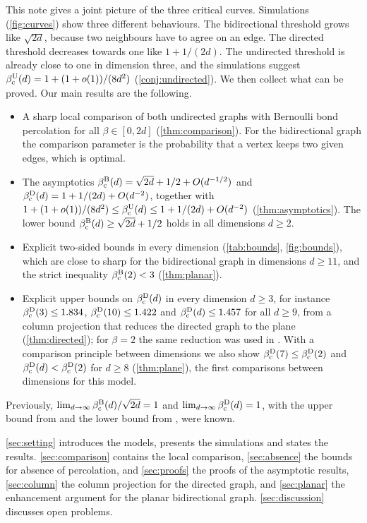\documentclass[11pt,letterpaper]{article}
\begin{document}
This note gives a joint picture of the three critical curves. Simulations (\cref{fig:curves}) show three different behaviours. The bidirectional threshold grows like $\sqrt{2d}$, because two neighbours have to agree on an edge. The directed threshold decreases towards one like $1+1/(2d)$. The undirected threshold is already close to one in dimension three, and the simulations suggest $\beta_{\mathrm c}^{\mathrm U}(d)=1+(1+o(1))/(8d^2)$ (\cref{conj:undirected}). We then collect what can be proved. Our main results are the following.
\begin{itemize}
\item A sharp local comparison of both undirected graphs with Bernoulli bond percolation for all $\beta\in[0,2d]$ (\cref{thm:comparison}). For the bidirectional graph the comparison parameter is the probability that a vertex keeps two given edges, which is optimal.
\item The asymptotics $\beta_{\mathrm c}^{\mathrm B}(d)=\sqrt{2d}+1/2+O(d^{-1/2})$ and $\beta_{\mathrm c}^{\mathrm D}(d)=1+1/(2d)+O(d^{-2})$, together with $1+(1+o(1))/(8d^2)\le\beta_{\mathrm c}^{\mathrm U}(d)\le1+1/(2d)+O(d^{-2})$ (\cref{thm:asymptotics}). The lower bound $\beta_{\mathrm c}^{\mathrm B}(d)\ge\sqrt{2d}+1/2$ holds in all dimensions $d\ge2$.
\item Explicit two-sided bounds in every dimension (\cref{tab:bounds}, \cref{fig:bounds}), which are close to sharp for the bidirectional graph in dimensions $d\ge11$, and the strict inequality $\beta_{\mathrm c}^{\mathrm B}(2)<3$ (\cref{thm:planar}).
\item Explicit upper bounds on $\beta_{\mathrm c}^{\mathrm D}(d)$ in every dimension $d\ge3$, for instance $\beta_{\mathrm c}^{\mathrm D}(3)\le1.834$, $\beta_{\mathrm c}^{\mathrm D}(10)\le1.422$ and $\beta_{\mathrm c}^{\mathrm D}(d)\le1.457$ for all $d\ge9$, from a column projection that reduces the directed graph to the plane (\cref{thm:directed}); for $\beta=2$ the same reduction was used in \cite{LXZ26}. With a comparison principle between dimensions we also show $\beta_{\mathrm c}^{\mathrm D}(7)\le\beta_{\mathrm c}^{\mathrm D}(2)$ and $\beta_{\mathrm c}^{\mathrm D}(d)<\beta_{\mathrm c}^{\mathrm D}(2)$ for $d\ge8$ (\cref{thm:plane}), the first comparisons between dimensions for this model.
\end{itemize}
Previously, $\lim_{d\to\infty}\beta_{\mathrm c}^{\mathrm B}(d)/\sqrt{2d}=1$ \cite[Proposition~3.8]{BJKLRT25} and $\lim_{d\to\infty}\beta_{\mathrm c}^{\mathrm D}(d)=1$, with the upper bound from \cite[Corollary~3.7]{BJKLRT25} and the lower bound from \cite[Lemma~2.2]{CHJK26}, were known.

\cref{sec:setting} introduces the models, presents the simulations and states the results. \cref{sec:comparison} contains the local comparison, \cref{sec:absence} the bounds for absence of percolation, and \cref{sec:proofs} the proofs of the asymptotic results, \cref{sec:column} the column projection for the directed graph, and \cref{sec:planar} the enhancement argument for the planar bidirectional graph. \cref{sec:discussion} discusses open problems.
\end{document}
